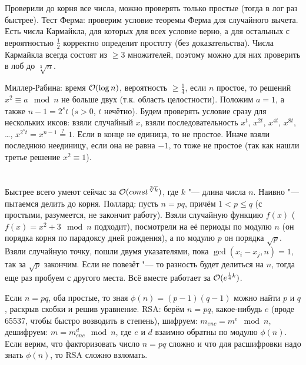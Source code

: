 \section{} %
Проверили до корня все числа, можно проверять только простые (тогда в лог раз быстрее).
Тест Ферма: проверим условие теоремы Ферма для случайного вычета.
Есть числа Кармайкла, для которых для всех условие верно, а для остальных с вероятностью $\frac 12$ корректно определит простоту (без доказательства).
Числа Кармайкла всегда состоят из $\ge 3$ множителей, поэтому можно для них проверить в лоб до $\sqrt[3]n$.

Миллер-Рабина: время $\mathcal{O}(\log n)$, вероятность $\ge \frac 14$, если $n$ простое, то решений $x^2 \equiv a \mod n$ не больше двух (т.к. область целостности).
Положим $a=1$, а также $n-1 = 2^st$ ($s>0$, $t$ нечётно).
Будем проверять условие сразу для нескольких иксов: взяли случайный $x$, взяли последовательность $x^t$, $x^{2t}$, $x^{4t}$, $x^{8t}$, \dots, $x^{2^st}=x^{n-1}\stackrel{?}{=}1$.
Если в конце не единица, то не простое.
Иначе взяли последнюю неединицу, если она не равна $-1$, то тоже не простое (так как нашли третье решение $x^2\equiv 1$).

\section{} %
Быстрее всего умеют сейчас за $\mathcal{O}(const ^{\sqrt[3]{k}})$, где $k$ "--- длина числа $n$.
Наивно "--- пытаемся делить до корня.
Поллард: пусть $n=pq$, причём $1 < p \le q$ (с простыми, разумеется, не закончит работу).
Взяли случайную функцию $f(x)$ ($f(x)=x^2+3\mod n$ подходит), посмотрели на её периоды по модулю $n$ (он порядка корня по парадоксу дней рождения),
а по модулю $p$ он порядка $\sqrt p$.
Взяли случайную точку, пошли двумя указателями, пока $\gcd(x_i - x_j, n) = 1$, так за $\sqrt p$ закончим.
Если не повезёт "--- то разность будет делиться на $n$, тогда еще раз пробуем с другого места.
Всё вместе работает за $\mathcal{O}(e^{\frac14k})$.

Если $n=pq$, оба простые, то зная $\phi(n)=(p-1)(q-1)$ можно найти $p$ и $q$, раскрыв скобки и решив уравнение.
RSA: берём $n=pq$, какое-нибудь $e$ (вроде 65537, чтобы быстро возводить в степень), шифруем: $m_{enc}=m^e \mod n$,
дешифруем: $m=m_{enc}^d \mod n$, где $e$ и $d$ взаимно обратны по модулю $\phi(n)$.
Если верим, что факторизовать число $n=pq$ сложно и что для расшифровки надо знать $\phi(n)$, то RSA сложно взломать.

